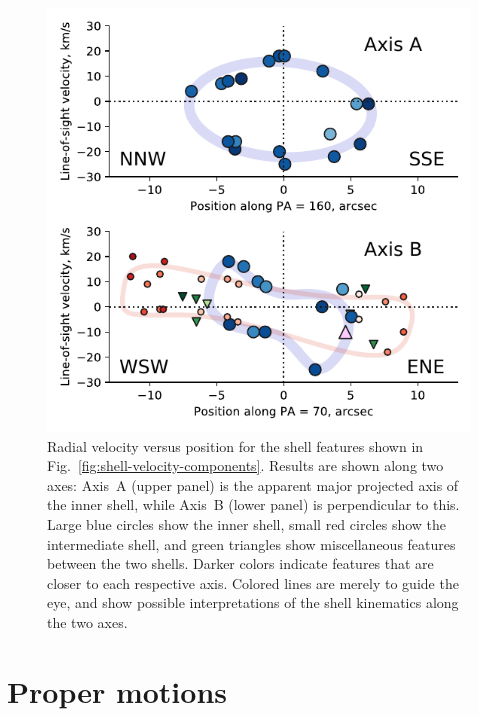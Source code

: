 \documentclass[useAMS, usenatbib]{mnras}
\begin{document}
\begin{figure}
  \centering
  \includegraphics[width=\linewidth]{figs/turtle-shell-velocity-axes-annotated}
  \caption{
    Radial velocity versus position
    for the shell features shown in Fig.~\ref{fig:shell-velocity-components}.
    Results are shown along two axes:
    Axis~A (upper panel) is the apparent major projected axis of the inner shell,
    while Axis~B (lower panel) is perpendicular to this.
    Large blue circles show the inner shell,
    small red circles show the intermediate shell,
    and green triangles show miscellaneous features between the two shells.
    Darker colors indicate features that are closer to each respective axis.
    Colored lines are merely to guide the eye,
    and show possible interpretations of the shell kinematics along the two axes.
  }
  \label{fig:shell-velocity-axes}
\end{figure}


\section{Proper motions}
\label{sec:proper-motions}
\end{document}
